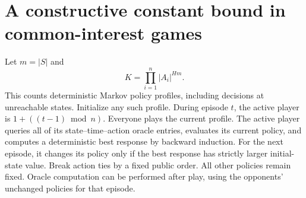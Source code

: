 \documentclass[11pt,a4paper]{article}
\theoremstyle{definition}
\theoremstyle{remark}
\begin{document}
\section{A constructive constant bound in common-interest games}
Let $m=|S|$ and
\[
 K=\prod_{i=1}^n |A_i|^{Hm}.
\]
This counts deterministic Markov policy profiles, including decisions at unreachable states. Initialize any such profile. During episode $t$, the active player is $1+((t-1)\bmod n)$. Everyone plays the current profile. The active player queries all of its state--time--action oracle entries, evaluates its current policy, and computes a deterministic best response by backward induction. For the next episode, it changes its policy only if the best response has strictly larger initial-state value. Break action ties by a fixed public order. All other policies remain fixed. Oracle computation can be performed after play, using the opponents' unchanged policies for that episode.
\end{document}
